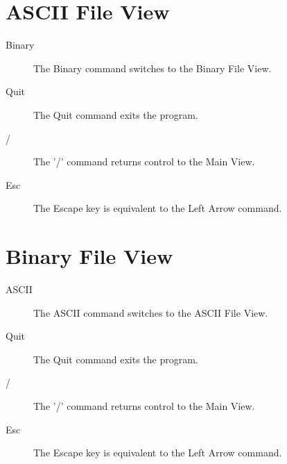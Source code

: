 \section{ASCII File View}

\begin{description} 
\item[Binary] \nl
            The Binary command switches to the Binary File View.
\item[Quit] \nl
            The Quit command exits the program.
\item[/] \nl
            The '/' command returns control to the Main View.
\item[Esc] \nl
            The Escape key is equivalent to the Left Arrow command.

\end{description}


\section{Binary File View}

\begin{description}
\item[ASCII] \nl
            The ASCII command switches to the ASCII File View.
\item[Quit] \nl
            The Quit command exits the program.
\item[/] \nl
            The '/' command returns control to the Main View.
\item[Esc] \nl
            The Escape key is equivalent to the Left Arrow command.
\end{description}
 

 


